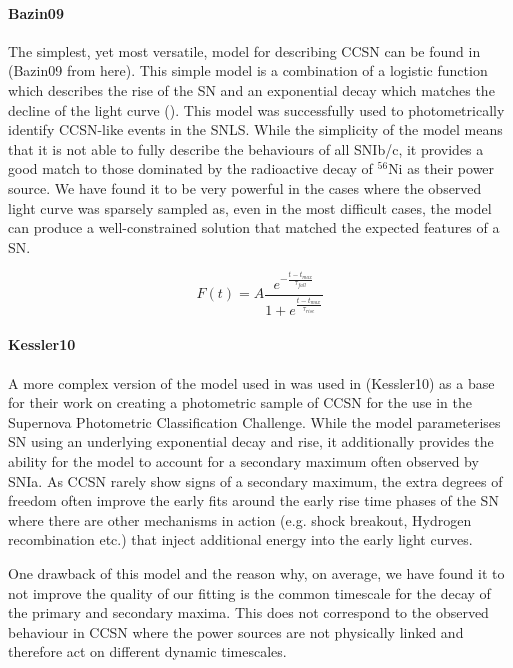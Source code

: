 \paragraph{Bazin09}
The simplest, yet most versatile, model for describing CCSN can be found in \citet{Bazin2009} (Bazin09 from here). This simple model is a combination of a logistic function which describes the rise of the SN and an exponential decay which matches the decline of the light curve (). This model was successfully used to photometrically identify CCSN-like events in the SNLS. While the simplicity of the model means that it is not able to fully describe the behaviours of all SNIb/c, it provides a good match to those dominated by the radioactive decay of $^{56}$Ni as their power source. We have found it to be very powerful in the cases where the observed light curve was sparsely sampled as, even in the most difficult cases, the model can produce a well-constrained solution that matched the expected features of a SN.

\begin{equation}
\label{eq:Bazin09}
  F(t) = A \frac{e^{-\frac{t - t_{max}}{\tau_{fall}}}} {1 + e^{\frac{t - t_{max}}{\tau_{rise}}}}
\end{equation}

\paragraph{Kessler10}
A more complex version of the model used in \citet{Bazin2009} was used in \citet{Kessler2010} (Kessler10) as a base for their work on creating a photometric sample of CCSN for the use in the Supernova Photometric Classification Challenge. While the model parameterises SN using an underlying exponential decay and rise, it additionally provides the ability for the model to account for a secondary maximum often observed by SNIa. As CCSN rarely show signs of a secondary maximum, the extra degrees of freedom often improve the early fits around the early rise time phases of the SN where there are other mechanisms in action (e.g. shock breakout, Hydrogen recombination etc.) that inject additional energy into the early light curves.

One drawback of this model and the reason why, on average, we have found it to not improve the quality of our fitting is the common timescale for the decay of the primary and secondary maxima. This does not correspond to the observed behaviour in CCSN where the power sources are not physically linked and therefore act on different dynamic timescales.


